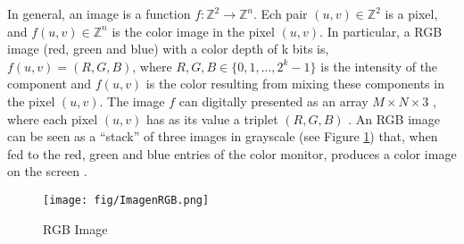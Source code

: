 In general, an image is a function $f:\mathbb{Z}^2 \rightarrow \mathbb{Z}^n$. Ech pair $(u,v) \in \mathbb{Z}^2$ is a pixel, and $f(u,v) \in \mathbb Z^n $ is the color image in the pixel $(u,v)$. In particular, a RGB image (red, green and blue) with a color depth of k bits is, $f(u,v) = (R,G,B)$, where $R,G,B \in \{0,1,...,2^k-1\}$ is the intensity of the component and $f(u,v)$ is the color resulting from mixing these components in the pixel $(u,v)$. %
The image $f$ can digitally presented as an array $M \times N \times 3$ , where each pixel $(u,v)$ has as its value a triplet $(R,G,B)$ \cite{gonzales2004digital}. An RGB image can be seen as a ``stack'' of three images in grayscale (see Figure \ref{fig:ImagenRGB}) that, when fed to the red, green and blue entries of the color monitor, produces a color image on the screen \cite{gonzales2004digital}.


\begin{figure}[htbp]
	\centering
		\texttt{[image: fig/ImagenRGB.png]}
	\caption{RGB Image}
	\label{fig:ImagenRGB}
\end{figure}



	
	
	
	
